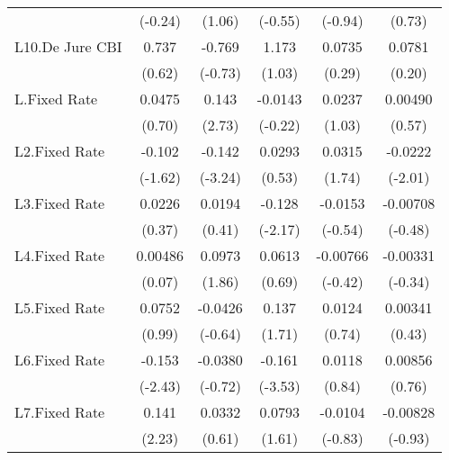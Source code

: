 {\begin{longtable}{l*{5}{c}}
                &  (-0.24)         &   (1.06)         &  (-0.55)         &  (-0.94)         &   (0.73)         \\
[1em]
L10.De Jure CBI &    0.737         &   -0.769         &    1.173         &   0.0735         &   0.0781         \\
                &   (0.62)         &  (-0.73)         &   (1.03)         &   (0.29)         &   (0.20)         \\
[1em]
L.Fixed Rate    &   0.0475         &    0.143\sym{**} &  -0.0143         &   0.0237         &  0.00490         \\
                &   (0.70)         &   (2.73)         &  (-0.22)         &   (1.03)         &   (0.57)         \\
[1em]
L2.Fixed Rate   &   -0.102         &   -0.142\sym{**} &   0.0293         &   0.0315         &  -0.0222\sym{*}  \\
                &  (-1.62)         &  (-3.24)         &   (0.53)         &   (1.74)         &  (-2.01)         \\
[1em]
L3.Fixed Rate   &   0.0226         &   0.0194         &   -0.128\sym{*}  &  -0.0153         & -0.00708         \\
                &   (0.37)         &   (0.41)         &  (-2.17)         &  (-0.54)         &  (-0.48)         \\
[1em]
L4.Fixed Rate   &  0.00486         &   0.0973         &   0.0613         & -0.00766         & -0.00331         \\
                &   (0.07)         &   (1.86)         &   (0.69)         &  (-0.42)         &  (-0.34)         \\
[1em]
L5.Fixed Rate   &   0.0752         &  -0.0426         &    0.137         &   0.0124         &  0.00341         \\
                &   (0.99)         &  (-0.64)         &   (1.71)         &   (0.74)         &   (0.43)         \\
[1em]
L6.Fixed Rate   &   -0.153\sym{*}  &  -0.0380         &   -0.161\sym{***}&   0.0118         &  0.00856         \\
                &  (-2.43)         &  (-0.72)         &  (-3.53)         &   (0.84)         &   (0.76)         \\
[1em]
L7.Fixed Rate   &    0.141\sym{*}  &   0.0332         &   0.0793         &  -0.0104         & -0.00828         \\
                &   (2.23)         &   (0.61)         &   (1.61)         &  (-0.83)         &  (-0.93)         \\

\end{longtable}}
